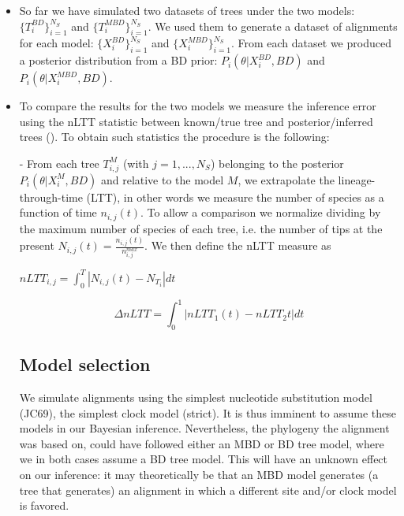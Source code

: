 \begin{itemize}
\item So far we have simulated two datasets of trees under the two models: 
$\{T_{i}^{BD}\}_{i=1}^{N_{S}}$ and $\{T_{i}^{MBD}\}_{i=1}^{N_{S}}$.
We used them to generate a dataset of alignments for each model: $\{X^{BD}_{i}\}_{i=1}^{N_{S}}$ and $\{X^{MBD}_{i}\}_{i=1}^{N_{S}}$. From each dataset we produced a posterior distribution from a BD prior: 
$P_{i}(\theta | X^{BD}_{i}, BD)$ and $P_{i}(\theta | X^{MBD}_{i}, BD)$.

\item To compare the results for the two models we measure the inference 
error using the nLTT statistic between known/true tree and 
posterior/inferred trees (\cite{nltt}). 
To obtain such statistics the procedure is the following:

- From each tree $T_{i,j}^{M}$ (with $j=1,...,N_{S}$) 
  belonging to the posterior $P_{i}(\theta | X^{M}_{i}, BD)$ 
  and relative to the model $M$, we extrapolate the lineage-through-time (LTT), 
  in other words we measure the number of species as a function of 
  time $n_{i,j}(t)$. To allow a comparison we normalize dividing by the 
  maximum number of species of each tree, i.e. the number of tips at the 
  present $N_{i,j}(t)=\frac{n_{i,j}(t)}{n^{max}_{i,j}}$. We then define the 
  nLTT measure as

$nLTT_{i,j} = \int_{0}^{T} | N_{i,j}(t) - N_{T_{i}} | dt$


$$
\Delta nLTT = \int_{0}^{1} | nLTT_1(t) - nLTT_2{t} | dt
$$

\subsection{Model selection}

We simulate alignments using the simplest nucleotide substitution model (JC69),
the simplest clock model (strict). It is thus imminent to assume these
models in our Bayesian inference. Nevertheless, the phylogeny the alignment
was based on, could have followed either an MBD or BD tree model, 
where we in both cases assume a BD tree model. This will have 
an unknown effect on our inference: it may theoretically be that an MBD model
generates (a tree that generates) an alignment in which a different site 
and/or clock model is favored. 


\end{itemize}
